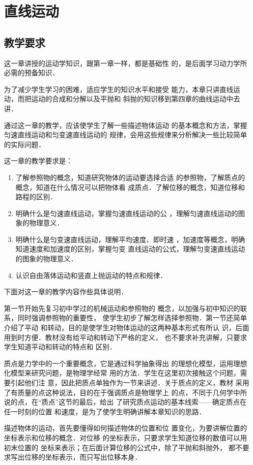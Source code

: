 \chapter{直线运动}\minitoc[n]
\section{教学要求}
这一章讲授的运动学知识，跟第一章一样，都是基础性
的，是后面学习动力学所必需的预备知识．

为了减少学生学习的困难，适应学生的知识水平和接受
能力，本章只讲直线运动，而把运动的合成和分解以及平抛和
斜抛的知识移到第四章的曲线运动中去讲．

通过这一章的教学，应该使学生了解一些描述物体运动
的基本概念和方法，掌握匀速直线运动和匀变速直线运动的
规律，会用这些规律来分析解决一些比较简单的实际问题．

这一章的教学要求是：
\begin{enumerate}
\item 了解参照物的概念，知道研究物体的运动要选择合适
的参照物，了解质点的概念，知道在什么情况可以把物体看
成质点．了解位移的概念，知道位移和路程的区别．
\item 明确什么是匀速直线运动，掌握匀速直线运动的公
，理解匀速直线运动的图象的物理意义．
\item 明确什么是匀变速直线运动，理解平均速度、即时速
，加速度等概念，明确知道速度和加速度的区别，掌握匀变
直线运动的公式，理解匀变速直线运动的图象的物理意义．
\item 认识自由落体运动和竖直上抛运动的特点和规律．
\end{enumerate}

下面对这一章的教学内容作些具体说明．

第一节开始先复习初中学过的机械运动和参照物的
概念，以加强与初中知识的联系，同时强调参照物的重要性，
使学生初步了解怎样选择参照物．第一节还简单介绍了平动
和转动，目的是使学生对物体运动的这两种基本形式有所认
识，后面用到时方便．教材没有给平动和转动下严格的定义，
也不要求补充讲解，只要求学生知道平动和转动的特点和
区别．

质点是力学中的一个重要概念，它是通过科学抽象得出
的理想化模型，运用理想化模型来研究问题，是物理学经常
用的方法．学生在这里初次接触这个问题，需要引起他们注
意，因此把质点单独作为一节来讲述．关于质点的定义，教材
采用了有质量的点这种说法，目的在于强调质点是物理学上
的点，不同于几何学中所说的点，在“质点”这节的最后，给出
了研究质点运动的基本线索——确定质点在任一时刻的位置
和速度，是为了使学生明确讲解本章知识的思路．

描述物体的运动，首先要懂得如何描述物体的位置和位
置变化，为要讲解位置的坐标表示和位移的概念．对位移
的坐标表示，只要求学生知道位移的数值可以用初末位置的
坐标来表示；在后面计算位移的公式中，除了平抛和斜抛外，
都不要求写出位移的坐标表示，而只写出位移本身．

